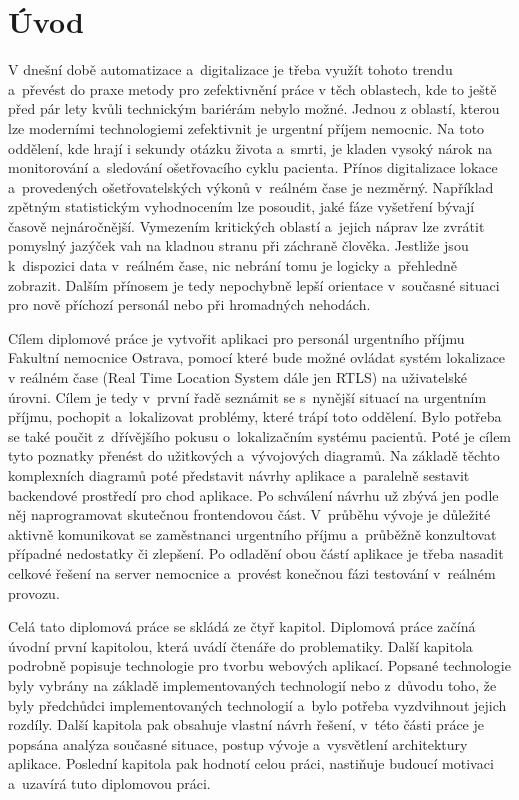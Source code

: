 \section{Úvod}
\label{sec:Uvod}

V dnešní době automatizace a~digitalizace je třeba využít tohoto trendu a~převést do praxe metody pro zefektivnění práce v těch oblastech, kde to ještě před pár lety kvůli technickým bariérám nebylo možné. Jednou z oblastí, kterou lze moderními technologiemi zefektivnit je urgentní příjem nemocnic. Na toto oddělení, kde hrají i sekundy otázku života a~smrti, je kladen vysoký nárok na monitorování a~sledování ošetřovacího cyklu pacienta. Přínos digitalizace lokace a~provedených ošetřovatelských výkonů v~reálném čase je nezměrný. Například zpětným statistickým vyhodnocením lze posoudit, jaké fáze vyšetření bývají časově nejnáročnější. Vymezením kritických oblastí a~jejich náprav lze zvrátit pomyslný jazýček vah na kladnou stranu při záchraně člověka. Jestliže jsou k~dispozici data v~reálném čase, nic nebrání tomu je logicky a~přehledně zobrazit. Dalším přínosem je tedy nepochybně lepší orientace v~současné situaci pro nově příchozí personál nebo při hromadných nehodách.

Cílem diplomové práce je vytvořit aplikaci pro personál urgentního příjmu Fakultní nemocnice Ostrava, pomocí které bude možné ovládat systém lokalizace v reálném čase (Real Time Location System dále jen RTLS) na uživatelské úrovni. Cílem je tedy v~první řadě seznámit se s~nynější situací na urgentním příjmu, pochopit a~lokalizovat problémy, které trápí toto oddělení. Bylo potřeba se také poučit z~dřívějšího pokusu o~lokalizačním systému pacientů. Poté je cílem tyto poznatky přenést do užitkových a~vývojových diagramů. Na základě těchto komplexních diagramů poté představit návrhy aplikace a~paralelně sestavit backendové prostředí pro chod aplikace. Po schválení návrhu už zbývá jen podle něj naprogramovat skutečnou frontendovou část. V~průběhu vývoje je důležité aktivně komunikovat se zaměstnanci urgentního příjmu a~průběžně konzultovat případné nedostatky či zlepšení. Po odladění obou částí aplikace je třeba nasadit celkové řešení na server nemocnice a~provést konečnou fázi testování v~reálném provozu. 

Celá tato diplomová práce se skládá ze čtyř kapitol. Diplomová práce začíná úvodní první kapitolou, která uvádí čtenáře do problematiky. Další kapitola podrobně popisuje technologie pro tvorbu webových aplikací. Popsané technologie byly vybrány na základě implementovaných technologií nebo z~důvodu toho, že byly předchůdci implementovaných technologií a~bylo potřeba vyzdvihnout jejich rozdíly. Další kapitola pak obsahuje vlastní návrh řešení, v~této části práce je popsána analýza současné situace, postup vývoje a~vysvětlení architektury aplikace. Poslední kapitola pak hodnotí celou práci, nastiňuje budoucí motivaci a~uzavírá tuto diplomovou práci.


